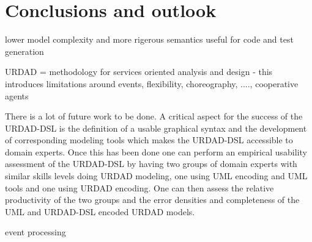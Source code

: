 \section{Conclusions and outlook \label{sec:conclusionsAndOutlook}}

lower model complexity and more rigerous semantics useful for code and test generation

URDAD = methodology for services oriented analysis and design - this introduces limitations around events, flexibility, choreography, ...., cooperative agents

There is a lot of future work to be done. A critical aspect for the success of the URDAD-DSL is the definition of a usable graphical syntax and the development of corresponding modeling tools which makes the URDAD-DSL accessible to domain experts. Once this has been done one can perform an empirical usability assessment of the URDAD-DSL by having two groups of domain experts with similar skills levels doing URDAD modeling, one using UML encoding and UML tools and one using URDAD encoding. One can then assess the relative productivity of the two groups and the error densities and completeness of the UML and URDAD-DSL encoded URDAD models.

event processing